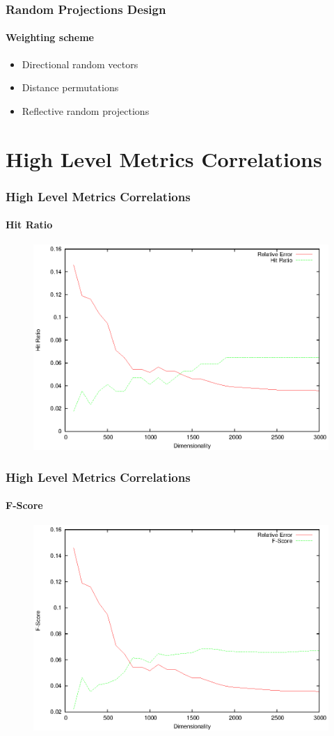 \documentclass{beamer}
\begin{document}
\begin{frame}
\frametitle{Random Projections Design}
\framesubtitle{Weighting scheme}

\begin{itemize}
  \item Directional random vectors
  \item Distance permutations
  \item Reflective random projections
\end{itemize}
\end{frame} 

\section{High Level Metrics Correlations}
\begin{frame}
\frametitle{High Level Metrics Correlations}
\framesubtitle{Hit Ratio}
 		\begin{figure}
		\includegraphics[scale=0.88]{hr.eps}
	\end{figure}
\end{frame}

\begin{frame}
\frametitle{High Level Metrics Correlations}
\framesubtitle{F-Score}
 		\begin{figure}
		\includegraphics[scale=0.88]{fscore.eps}
	\end{figure}
\end{frame}
\end{document}
